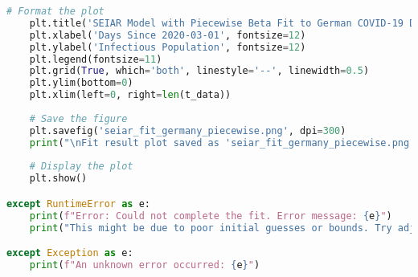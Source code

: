 \begin{lstlisting}[language=Python, caption={Python script for fitting a two-stage piecewise deterministic SEIAR model, corresponding to the pre- and post-lockdown phases.}]
    # Format the plot
    plt.title('SEIAR Model with Piecewise Beta Fit to German COVID-19 Data', fontsize=16)
    plt.xlabel('Days Since 2020-03-01', fontsize=12)
    plt.ylabel('Infectious Population', fontsize=12)
    plt.legend(fontsize=11)
    plt.grid(True, which='both', linestyle='--', linewidth=0.5)
    plt.ylim(bottom=0)
    plt.xlim(left=0, right=len(t_data))
    
    # Save the figure
    plt.savefig('seiar_fit_germany_piecewise.png', dpi=300)
    print("\nFit result plot saved as 'seiar_fit_germany_piecewise.png'")
    
    # Display the plot
    plt.show()

except RuntimeError as e:
    print(f"Error: Could not complete the fit. Error message: {e}")
    print("This might be due to poor initial guesses or bounds. Try adjusting `initial_guesses` and `bounds`.")

except Exception as e:
    print(f"An unknown error occurred: {e}")
\end{lstlisting}


